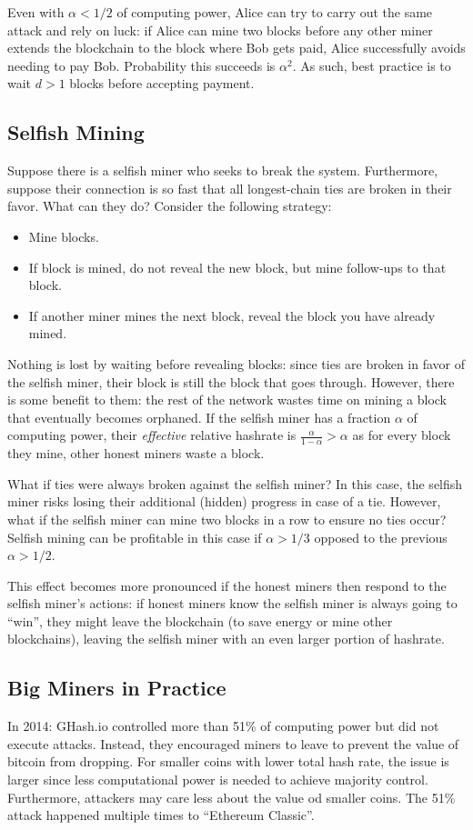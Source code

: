 \documentclass[dvipsnames]{article}
\theoremstyle{definition}
\theoremstyle{remark}
\begin{document}
Even with $\alpha < 1/2$ of computing power, Alice can try to carry out the same attack and rely on luck: if Alice can mine two blocks before any other miner extends the blockchain to the block where Bob gets paid, Alice successfully avoids needing to pay Bob. Probability this succeeds is $\alpha^2$. As such, best practice is to wait $d > 1$ blocks before accepting payment.  

\subsection{Selfish Mining}
Suppose there is a selfish miner who seeks to break the system. Furthermore, suppose their connection is so fast that all longest-chain ties are broken in their favor. What can they do? Consider the following strategy:
\begin{itemize}
	\item Mine blocks.
	\item If block is mined, do not reveal the new block, but mine follow-ups to that block.
	\item If another miner mines the next block, reveal the block you have already mined.
\end{itemize}
Nothing is lost by waiting before revealing blocks: since ties are broken in favor of the selfish miner, their block is still the block that goes through. However, there is some benefit to them: the rest of the network wastes time on mining a block that eventually becomes orphaned. If the selfish miner has a fraction $\alpha$ of computing power, their \textit{effective} relative hashrate is $\frac{\alpha}{1-\alpha} > \alpha$ as for every block they mine, other honest miners waste a block.

What if ties were always broken against the selfish miner? In this case, the selfish miner risks losing their additional (hidden) progress in case of a tie. However, what if the selfish miner can mine two blocks in a row to ensure no ties occur? Selfish mining can be profitable in this case if $\alpha > 1/3$ opposed to the previous $\alpha > 1/2$.

This effect becomes more pronounced if the honest miners then respond to the selfish miner's actions: if honest miners know the selfish miner is always going to ``win'', they might leave the blockchain (to save energy or mine other blockchains), leaving the selfish miner with an even larger portion of hashrate. 

\subsection{Big Miners in Practice}
In 2014: GHash.io controlled more than 51\% of computing power but did not execute attacks. Instead, they encouraged miners to leave to prevent the value of bitcoin from dropping. For smaller coins with lower total hash rate, the issue is larger since less computational power is needed to achieve majority control. Furthermore, attackers may care less about the value od smaller coins. The 51\% attack happened multiple times to ``Ethereum Classic''.
\end{document}
